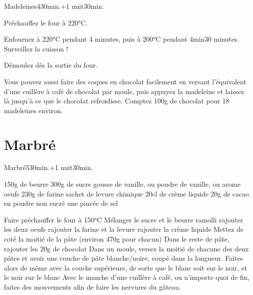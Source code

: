 {\begin{recette}{Madeleines}{4}{30min.+1 nuit}{30min.}
\begin{cuisson}
Préchauffez le four à 220°C. 

Enfournez à 220°C pendant 4 minutes, puis à 200°C pendant 4min30 minutes. Surveillez la cuisson !

Démoulez dès la sortie du four.

\begin{remarque}
Vous pouvez aussi faire des coques en chocolat facilement en versant l'équivalent d'une cuillère à café de chocolat par moule, puis appuyez la madeleine et laissez là jusqu'à ce que le chocolat refroidisse. Comptez 100g de chocolat pour 18 madeleines environ.
\end{remarque}

\end{cuisson}
\end{recette}

\section{Marbré}
\begin{recette}{Marbré}{5}{30min.+1 nuit}{30min.}
\begin{ingredients}
\ingredient 150g de beurre
\ingredient 300g de sucre
 gousse de vanille, ou poudre de vanille, ou arome
 oeufs
\ingredient 230g de farine
 sachet de levure chimique
\ingredient 20cl de crème liquide
\ingredient 20g de cacao en poudre non sucré
\ingredient une pincée de sel
\end{ingredients}

\begin{preparation}
\etape Faire préchauffer le four à 150°C
\etape Mélanger le sucre et le beurre ramolli
\etape rajouter les deux oeufs
\etape rajouter la farine et la levure
\etape rajouter la crème liquide
\etape Mettez de coté la moitié de la pâte (environ 470g pour chacun)
\etape Dans le reste de pâte, rajouter les 20g de chocolat
\etape Dans un moule, versez la moitié de chacune des deux pâtes et avoir une couche de pâte blanche/noire, coupé dans la longueur.
\etape Faites alors de même avec la couche supérieure, de sorte que le blanc soit sur le noir, et le noir sur le blanc
\etape Avec le manche d'une cuillère à café, ou n'importe quoi de fin, faites des mouvements afin de faire les nervures du gâteau.
\end{preparation}


\end{recette}}
